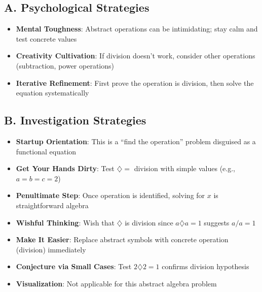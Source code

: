 \documentclass[11pt]{article}
\begin{document}
\begin{strategicbox}
\subsection*{A. Psychological Strategies}
\begin{itemize}[leftmargin=*]
    \item \textbf{Mental Toughness}: Abstract operations can be intimidating; stay calm and test concrete values
    \item \textbf{Creativity Cultivation}: If division doesn't work, consider other operations (subtraction, power operations)
    \item \textbf{Iterative Refinement}: First prove the operation is division, then solve the equation systematically
\end{itemize}

\subsection*{B. Investigation Strategies}
\begin{itemize}[leftmargin=*]
    \item \textbf{Startup Orientation}: This is a ``find the operation'' problem disguised as a functional equation
    \item \textbf{Get Your Hands Dirty}: Test $\diamondsuit = $ division with simple values (e.g., $a=b=c=2$)
    \item \textbf{Penultimate Step}: Once operation is identified, solving for $x$ is straightforward algebra
    \item \textbf{Wishful Thinking}: Wish that $\diamondsuit$ is division since $a \diamondsuit a = 1$ suggests $a/a = 1$
    \item \textbf{Make It Easier}: Replace abstract symbols with concrete operation (division) immediately
    \item \textbf{Conjecture via Small Cases}: Test $2 \diamondsuit 2 = 1$ confirms division hypothesis
    \item \textbf{Visualization}: Not applicable for this abstract algebra problem
\end{itemize}


\end{strategicbox}
\end{document}
